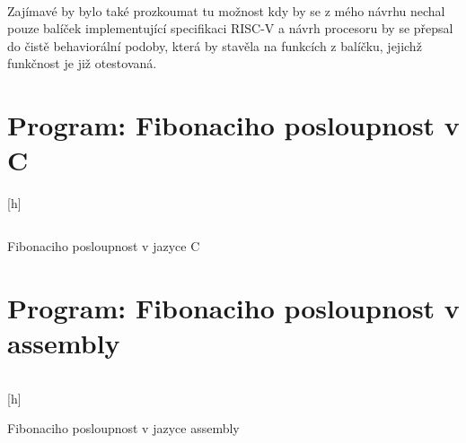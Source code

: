 \documentclass[FM,BP]{tulthesis}
\newenvironment{myquote}{\begin{list}{}{\setlength\leftmargin\parindent}\item[]}{\end{list}}
\newenvironment{listing}{\begin{myquote}\color{\tulcolor}}{\end{myquote}}
\begin{document}
\paragraph{}
Zajímavé by bylo také prozkoumat tu možnost kdy by se z mého návrhu nechal pouze balíček implementující specifikaci RISC-V a návrh procesoru by se přepsal do čistě behaviorální podoby, která by stavěla na funkcích z balíčku, jejichž funkčnost je již otestovaná. 


\appendix









\section{Program: Fibonaciho posloupnost v C}
\begin{listing}[h]
    \inputminted[linenos]{c}{assets/fibonaci.c}
    \caption{Fibonaciho posloupnost v jazyce C}
    \label{listing:fib_c}
\end{listing}
\newpage

\section{Program: Fibonaciho posloupnost v assembly}
\inputminted[linenos]{gas}{assets/fib_func.asm}
\begin{listing}[h]
    \caption{Fibonaciho posloupnost v jazyce assembly}
    \label{listing:fib_asm}
\end{listing}

\printbibliography[title={Použitá literatura}] %

\renewcommand{\indexname}{Rejstřík instrukcí a pojmů}
\printindex
\end{document}
